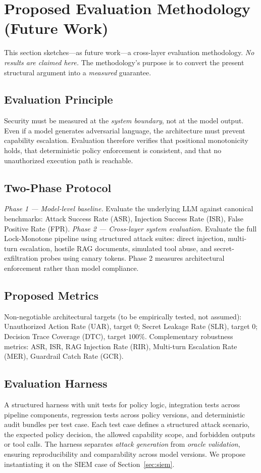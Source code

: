 \documentclass[conference]{IEEEtran}
\begin{document}
\section{Proposed Evaluation Methodology (Future Work)}
\label{sec:eval}

This section sketches---as future work---a cross-layer evaluation
methodology. \emph{No results are claimed here.} The methodology's purpose
is to convert the present structural argument into a \emph{measured}
guarantee.

\subsection{Evaluation Principle}
Security must be measured at the \emph{system boundary}, not at the model
output. Even if a model generates adversarial language, the architecture
must prevent capability escalation. Evaluation therefore verifies that
positional monotonicity holds, that deterministic policy enforcement is
consistent, and that no unauthorized execution path is reachable.

\subsection{Two-Phase Protocol}
\emph{Phase 1 --- Model-level baseline.} Evaluate the underlying LLM
against canonical benchmarks: Attack Success Rate (ASR), Injection Success
Rate (ISR), False Positive Rate (FPR). \emph{Phase 2 --- Cross-layer
system evaluation.} Evaluate the full Lock-Monotone pipeline using
structured attack suites: direct injection, multi-turn escalation, hostile
RAG documents, simulated tool abuse, and secret-exfiltration probes using
canary tokens. Phase 2 measures architectural enforcement rather than
model compliance.

\subsection{Proposed Metrics}
Non-negotiable architectural targets (to be empirically tested, not
assumed): Unauthorized Action Rate (UAR), target $0$; Secret Leakage Rate
(SLR), target $0$; Decision Trace Coverage (DTC), target $100\%$.
Complementary robustness metrics: ASR, ISR, RAG Injection Rate (RIR),
Multi-turn Escalation Rate (MER), Guardrail Catch Rate (GCR).

\subsection{Evaluation Harness}
A structured harness with unit tests for policy logic, integration tests
across pipeline components, regression tests across policy versions, and
deterministic audit bundles per test case. Each test case defines a
structured attack scenario, the expected policy decision, the allowed
capability scope, and forbidden outputs or tool calls. The harness
separates \emph{attack generation} from \emph{oracle validation}, ensuring
reproducibility and comparability across model versions. We propose
instantiating it on the SIEM case of Section~\ref{sec:siem}.
\end{document}
